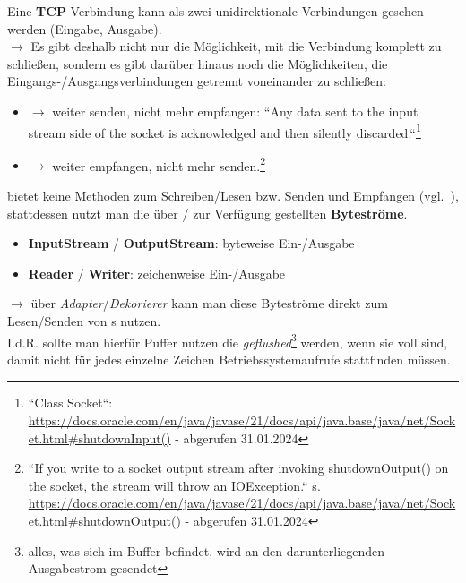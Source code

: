 \noindent
Eine \textbf{TCP}-Verbindung kann als zwei unidirektionale Verbindungen gesehen werden (Eingabe, Ausgabe).\\
$\rightarrow$ Es gibt deshalb nicht nur die Möglichkeit, mit  die Verbindung komplett zu schließen, sondern es gibt darüber hinaus noch die Möglichkeiten, die Eingangs-/Ausgangsverbindungen getrennt voneinander zu schließen:


\begin{itemize}
    \item {} $\rightarrow$ weiter senden, nicht mehr empfangen: ``Any data sent to the input stream side of the socket is acknowledged and then silently discarded.``\footnote{``Class Socket``: \url{https://docs.oracle.com/en/java/javase/21/docs/api/java.base/java/net/Socket.html#shutdownInput()} - abgerufen 31.01.2024
    }
    \item {}  $\rightarrow$ weiter empfangen, nicht mehr senden.\footnote{``If you write to a socket output stream after invoking shutdownOutput() on the socket, the stream will throw an IOException.`` s. \url{https://docs.oracle.com/en/java/javase/21/docs/api/java.base/java/net/Socket.html#shutdownOutput()} - abgerufen 31.01.2024
    }
\end{itemize}

\noindent
{} bietet keine Methoden zum Schreiben/Lesen {bzw.} Senden und Empfangen (vgl.~\cite[282]{Oec22}), stattdessen nutzt man die über  /  zur Verfügung gestellten \textbf{Byteströme}.

\begin{tcolorbox}
    \begin{itemize}
        \item \textbf{InputStream} / \textbf{OutputStream}: byteweise Ein-/Ausgabe
        \item \textbf{Reader} / \textbf{Writer}: zeichenweise Ein-/Ausgabe
    \end{itemize}
\end{tcolorbox}

\noindent
$\rightarrow$ über \textit{Adapter}/\textit{Dekorierer} kann man diese Byteströme direkt zum Lesen/Senden von s nutzen.\\
I.d.R. sollte man hierfür Puffer nutzen die \textit{geflushed}\footnote{alles, was sich im Buffer befindet, wird an den darunterliegenden Ausgabestrom gesendet} werden, wenn sie voll sind, damit nicht für jedes einzelne Zeichen Betriebssystemaufrufe stattfinden müssen.\\

